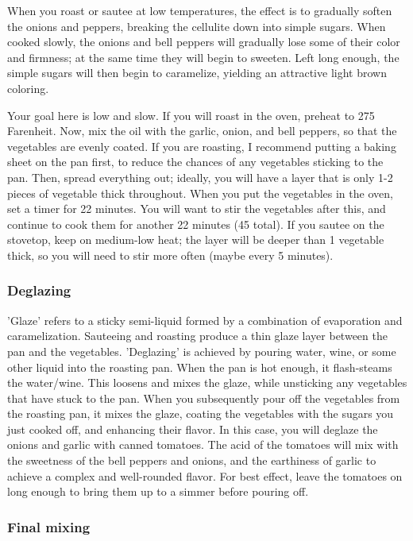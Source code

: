 When you roast or sautee at low temperatures, the effect is to gradually soften the onions and peppers, breaking the cellulite down into simple sugars. When cooked slowly, the onions and bell peppers will gradually lose some of their color and firmness; at the same time they will begin to sweeten. Left long enough, the simple sugars will then begin to caramelize, yielding an attractive light brown coloring.

Your goal here is low and slow. If you will roast in the oven, preheat to 275 Farenheit. Now, mix the oil with the garlic, onion, and bell peppers, so that the vegetables are evenly coated. If you are roasting, I recommend putting a baking sheet on the pan first, to reduce the chances of any vegetables sticking to the pan. Then, spread everything out; ideally, you will have a layer that is only 1-2 pieces of vegetable thick throughout. When you put the vegetables in the oven, set a timer for 22 minutes. You will want to stir the vegetables after this, and continue to cook them for another 22 minutes (45 total). If you sautee on the stovetop, keep on medium-low heat; the layer will be deeper than 1 vegetable thick, so you will need to stir more often (maybe every 5 minutes).

\subsubsection{Deglazing}

'Glaze' refers to a sticky semi-liquid formed by a combination of evaporation and caramelization. Sauteeing and roasting produce a thin glaze layer between the pan and the vegetables. 'Deglazing' is achieved by pouring water, wine, or some other liquid into the roasting pan. When the pan is hot enough, it flash-steams the water/wine. This loosens and mixes the glaze, while unsticking any vegetables that have stuck to the pan. When you subsequently pour off the vegetables from the roasting pan, it mixes the glaze, coating the vegetables with the sugars you just cooked off, and enhancing their flavor. In this case, you will deglaze the onions and garlic with canned tomatoes. The acid of the tomatoes will mix with the sweetness of the bell peppers and onions, and the earthiness of garlic to achieve a complex and well-rounded flavor. For best effect, leave the tomatoes on long enough to bring them up to a simmer before pouring off.

\subsubsection{Final mixing}

